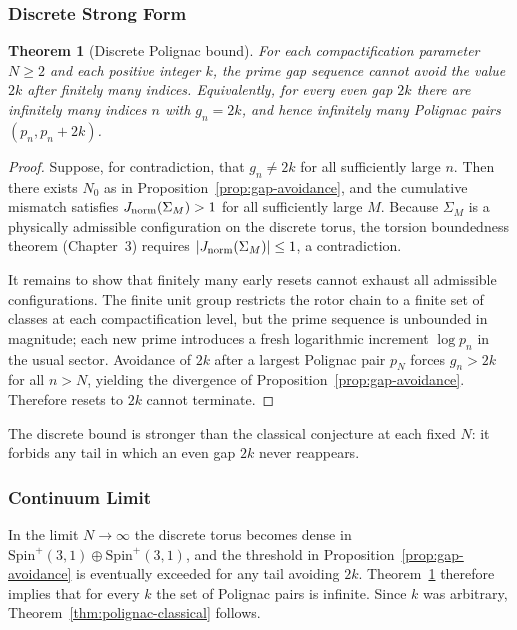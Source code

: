 \documentclass[dvipdfmx,a4paper]{article}
\newtheorem{theorem}{Theorem}[section]
\theoremstyle{definition}
\theoremstyle{remark}
\newcommand{\Jnorm}{J_{\rm norm}}
\begin{document}
\subsubsection{Discrete Strong Form}

\begin{theorem}[Discrete Polignac bound]
\label{thm:discrete-polignac}
For each compactification parameter \( N \geq 2 \) and each positive integer \( k \), the prime gap sequence cannot avoid the value \( 2k \) after finitely many indices. Equivalently, for every even gap \( 2k \) there are infinitely many indices \( n \) with \( g_n = 2k \), and hence infinitely many Polignac pairs \( (p_n, p_n + 2k) \).
\end{theorem}

\begin{proof}
Suppose, for contradiction, that \( g_n \neq 2k \) for all sufficiently large \( n \). Then there exists \( N_0 \) as in Proposition~\ref{prop:gap-avoidance}, and the cumulative mismatch satisfies \( \Jnorm(\Sigma_M) > 1 \) for all sufficiently large \( M \). Because \( \Sigma_M \) is a physically admissible configuration on the discrete torus, the torsion boundedness theorem (Chapter~3) requires \( |\Jnorm(\Sigma_M)| \leq 1 \), a contradiction.

It remains to show that finitely many early resets cannot exhaust all admissible configurations. The finite unit group restricts the rotor chain to a finite set of classes at each compactification level, but the prime sequence is unbounded in magnitude; each new prime introduces a fresh logarithmic increment \( \log p_n \) in the usual sector. Avoidance of \( 2k \) after a largest Polignac pair \( p_N \) forces \( g_n > 2k \) for all \( n > N \), yielding the divergence of Proposition~\ref{prop:gap-avoidance}. Therefore resets to \( 2k \) cannot terminate.
\end{proof}

The discrete bound is stronger than the classical conjecture at each fixed \( N \): it forbids any tail in which an even gap \( 2k \) never reappears.

\subsubsection{Continuum Limit}

In the limit \( N \to \infty \) the discrete torus becomes dense in \( \mathrm{Spin}^+(3,1) \oplus \mathrm{Spin}^+(3,1) \), and the threshold in Proposition~\ref{prop:gap-avoidance} is eventually exceeded for any tail avoiding \( 2k \). Theorem~\ref{thm:discrete-polignac} therefore implies that for every \( k \) the set of Polignac pairs is infinite. Since \( k \) was arbitrary, Theorem~\ref{thm:polignac-classical} follows.
\end{document}
